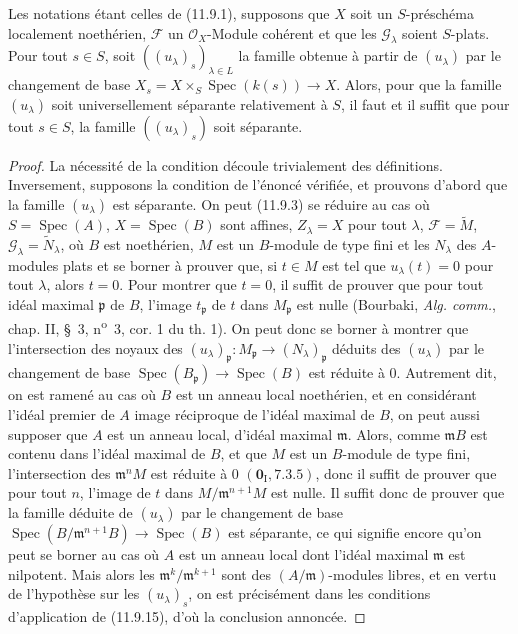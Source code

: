 \begin{theorem}[11.9.16]
\label{IV.11.9.16-fr}
Les notations étant celles de (11.9.1), supposons que $X$ soit un
$S$-préschéma localement noethérien, $\mathcal F$ un $\mathcal O_X$-Module
cohérent et que les $\mathcal G_\lambda$ soient $S$-plats. Pour tout $s\in S$,
soit $((u_\lambda)_s)_{\lambda\in L}$ la famille obtenue à partir de
$(u_\lambda)$ par le changement de base
$X_s=X\times_S\operatorname{Spec}(k(s))\to X$. Alors, pour que la famille
$(u_\lambda)$ soit universellement séparante relativement à $S$, il faut et il
suffit que pour tout $s\in S$, la famille $((u_\lambda)_s)$ soit séparante.
\end{theorem}

\begin{proof}
La nécessité de la condition découle trivialement des définitions.
Inversement, supposons la condition de l'énoncé vérifiée, et prouvons d'abord
que la famille $(u_\lambda)$ est séparante. On peut (11.9.3) se réduire au cas
où $S=\operatorname{Spec}(A)$, $X=\operatorname{Spec}(B)$ sont affines,
$Z_\lambda=X$ pour tout $\lambda$, $\mathcal F=\widetilde M$,
$\mathcal G_\lambda=\widetilde N_\lambda$, où $B$ est noethérien, $M$ est un
$B$-module de type fini et les $N_\lambda$ des $A$-modules plats et se borner à
prouver que, si $t\in M$ est tel que $u_\lambda(t)=0$ pour tout $\lambda$,
alors $t=0$. Pour montrer que $t=0$, il suffit de prouver que pour tout idéal
maximal $\mathfrak p$ de $B$, l'image $t_\mathfrak p$ de $t$ dans
$M_\mathfrak p$ est nulle (Bourbaki, \emph{Alg. comm.}, chap. II, \S~3,
n\textsuperscript{o}~3, cor. 1 du th. 1). On peut donc se borner à montrer que
l'intersection
des noyaux des
$(u_\lambda)_\mathfrak p:M_\mathfrak p\to(N_\lambda)_\mathfrak p$ déduits
des $(u_\lambda)$ par le changement de base
$\operatorname{Spec}(B_\mathfrak p)\to\operatorname{Spec}(B)$ est réduite à
0. Autrement dit, on est ramené au cas où $B$ est un anneau local noethérien,
et en considérant l'idéal premier de $A$ image réciproque de l'idéal maximal de
$B$, on peut aussi supposer que $A$ est un anneau local, d'idéal maximal
$\mathfrak m$. Alors, comme $\mathfrak mB$ est contenu dans l'idéal maximal de
$B$, et que $M$ est un $B$-module de type fini, l'intersection des
$\mathfrak m^nM$ est réduite à 0 $(\mathbf 0_{\mathrm I},7.3.5)$, donc il
suffit de prouver que pour tout $n$, l'image de $t$ dans
$M/\mathfrak m^{n+1}M$ est nulle. Il suffit donc de prouver que la famille
déduite de $(u_\lambda)$ par le changement de base
$\operatorname{Spec}(B/\mathfrak m^{n+1}B)\to\operatorname{Spec}(B)$ est
séparante, ce qui signifie encore qu'on peut se borner au cas où $A$ est un
anneau local dont l'idéal maximal $\mathfrak m$ est nilpotent. Mais alors les
$\mathfrak m^k/\mathfrak m^{k+1}$ sont des $(A/\mathfrak m)$-modules libres,
et en vertu de l'hypothèse sur les $(u_\lambda)_s$, on est précisément dans les
conditions d'application de (11.9.15), d'où la conclusion annoncée.


\end{proof}
